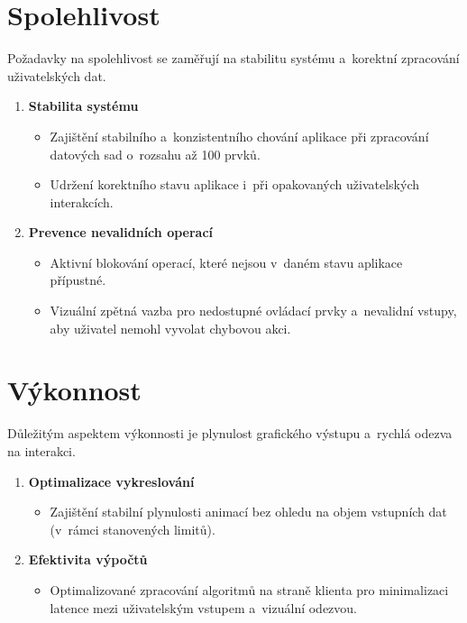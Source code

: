 \section{Spolehlivost}
\label{sec:reliability}

Požadavky na spolehlivost se zaměřují na stabilitu systému a~korektní zpracování uživatelských dat.

\begin{enumerate}
    \item \textbf{Stabilita systému}
          \begin{itemize}[nosep]
              \item Zajištění stabilního a~konzistentního chování aplikace při zpracování datových sad o~rozsahu až 100 prvků.
              \item Udržení korektního stavu aplikace i~při opakovaných uživatelských interakcích.
          \end{itemize}

    \item \textbf{Prevence nevalidních operací}
          \begin{itemize}[nosep]
              \item Aktivní blokování operací, které nejsou v~daném stavu aplikace přípustné.
              \item Vizuální zpětná vazba pro nedostupné ovládací prvky a~nevalidní vstupy, aby uživatel nemohl vyvolat chybovou akci.
          \end{itemize}
\end{enumerate}

\section{Výkonnost}
\label{sec:performance}

Důležitým aspektem výkonnosti je plynulost grafického výstupu a~rychlá odezva na interakci.

\begin{enumerate}
    \item \textbf{Optimalizace vykreslování}
          \begin{itemize}[nosep]
              \item Zajištění stabilní plynulosti animací bez ohledu na objem vstupních dat (v~rámci stanovených limitů).
          \end{itemize}

    \item \textbf{Efektivita výpočtů}
          \begin{itemize}[nosep]
              \item Optimalizované zpracování algoritmů na straně klienta pro minimalizaci latence mezi uživatelským vstupem a~vizuální odezvou.
          \end{itemize}
\end{enumerate}

